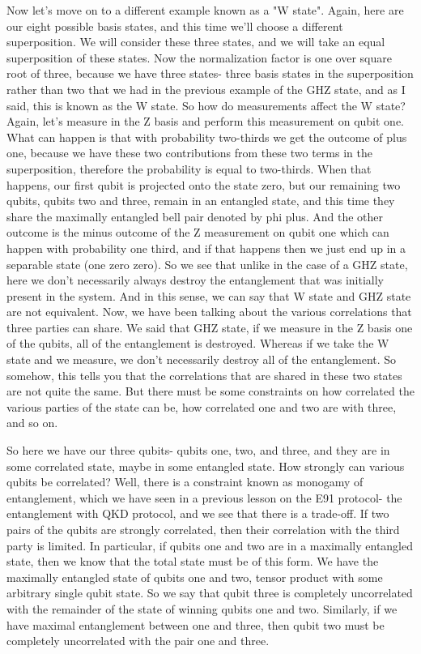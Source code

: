 Now let's move on to a different example known as a "W state". Again, here are our eight possible basis states, and this time we'll choose a different superposition. We will consider these three states, and we will take an equal superposition of these states. Now the normalization factor is one over square root of three, because we have three states- three basis states in the superposition rather than two that we had in the previous example of the GHZ state, and as I said, this is known as the W state. So how do measurements affect the W state? Again, let's measure in the Z basis and perform this measurement on qubit one. What can happen is that with probability two-thirds we get the outcome of plus one, because we have these two contributions from these two terms in the superposition, therefore the probability is equal to two-thirds. When that happens, our first qubit is projected onto the state zero, but our remaining two qubits, qubits two and three, remain in an entangled state, and this time they share the maximally entangled bell pair denoted by phi plus. And the other outcome is the minus outcome of the Z measurement on qubit one which can happen with probability one third, and if that happens then we just end up in a separable state (one zero zero). So we see that unlike in the case of a GHZ state, here we don't necessarily always destroy the entanglement that was initially present in the system. And in this sense, we can say that W state and GHZ state are not equivalent. Now, we have been talking about the various correlations that three parties can share. We said that GHZ state, if we measure in the Z basis one of the qubits, all of the entanglement is destroyed. Whereas if we take the W state and we measure, we don't necessarily destroy all of the entanglement. So somehow, this tells you that the correlations that are shared in these two states are not quite the same. But there must be some constraints on how correlated the various parties of the state can be, how correlated one and two are with three, and so on.

So here we have our three qubits- qubits one, two, and three, and they are in some correlated state, maybe in some entangled state. How strongly can various qubits be correlated? Well, there is a constraint known as monogamy of entanglement, which we have seen in a previous lesson on the E91 protocol- the entanglement with QKD protocol, and we see that there is a trade-off. If two pairs of the qubits are strongly correlated, then their correlation with the third party is limited. In particular, if qubits one and two are in a maximally entangled state, then we know that the total state must be of this form. We have the maximally entangled state of qubits one and two, tensor product with some arbitrary single qubit state. So we say that qubit three is completely uncorrelated with the remainder of the state of winning qubits one and two. Similarly, if we have maximal entanglement between one and three, then qubit two must be completely uncorrelated with the pair one and three.

